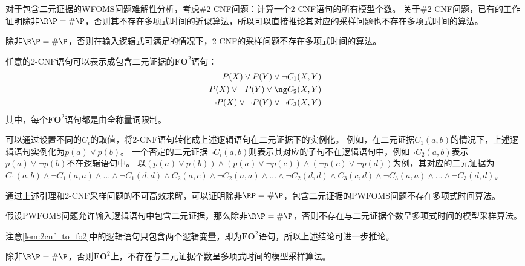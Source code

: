 \documentclass[12pt,UTF8,AutoFakeBold=3,a4paper]{ctexart} %
\newcommand{\fotwo}{\ensuremath{\mathbf{FO}^2}}
\begin{document}

对于包含二元证据的WFOMS问题难解性分析，考虑$\#2$-CNF问题：计算一个$2$-CNF语句的所有模型个数。
关于$\#2$-CNF问题，已有的工作证明除非$\R\P=\#\P$，否则其不存在多项式时间的近似算法，所以可以直接推论其对应的采样问题也不存在多项式时间的算法。
\begin{theorem}
  除非$\R\P=\#\P$，否则在输入逻辑式可满足的情况下，$2$-CNF的采样问题不存在多项式时间的算法。
\end{theorem}
\begin{lemma}\label{lem:2cnf_to_fo2}
    任意的2-CNF语句可以表示成包含二元证据的$\mathbf{FO}^2$语句：
    \begin{align*}
        P(X)\lor P(Y)\lor \neg C_1(X,Y)\\
        P(X)\lor \neg P(Y)\lor \ng C_2(X,Y)\\
        \neg P(X)\lor \neg P(Y)\lor \neg C_3(X,Y)
    \end{align*}
    其中，每个$\mathbf{FO}^2$语句都是由全称量词限制。
\end{lemma}
可以通过设置不同的$C_i$的取值，将2-CNF语句转化成上述逻辑语句在二元证据下的实例化。
例如，在二元证据$C_1(a,b)$的情况下，上述逻辑语句实例化为$p(a)\lor p(b)$。
一个否定的二元证据$\neg C_i(a,b)$则表示其对应的子句不在逻辑语句中，例如$\neg C_2(a,b)$表示$p(a)\lor \neg p(b)$不在逻辑语句中。
以$(p(a)\lor p(b)) \land (p(a)\lor \neg p(c)) \land (\neg p(c)\lor \neg p(d))$为例，其对应的二元证据为$C_1(a,b)\land \neg C_1(a,a)\land \dots \land \neg C_1(d,d)\land C_2(a,c)\land \neg C_2(a,a)\land \dots \land \neg C_2(d,d)\land C_3(c,d)\land \neg C_3(a,a)\land \dots \land \neg C_3(d,d)$。

通过上述引理和2-CNF采样问题的不可高效求解，可以证明除非$\RP=\#\P$，包含二元证据的PWFOMS问题不存在多项式时间算法。
\begin{theorem}
    假设PWFOMS问题允许输入逻辑语句中包含二元证据，那么除非$\R\P=\#\P$，否则不存在与二元证据个数呈多项式时间的模型采样算法。
\end{theorem}
注意\cref{lem:2cnf_to_fo2}中的逻辑语句只包含两个逻辑变量，即为\fotwo{}语句，所以上述结论可进一步推论。
\begin{corollary}
  除非$\R\P=\#\P$，否则\fotwo{}上，不存在与二元证据个数呈多项式时间的模型采样算法。
\end{corollary}

\end{document}
